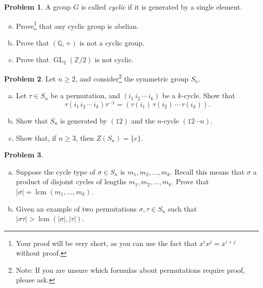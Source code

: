 \documentclass[11pt]{article}
\DeclareMathOperator{\lcm}{lcm}
\theoremstyle{definition}
\newtheorem{problem}{Problem}
\begin{document}
\begin{problem}
	A group $G$ is called {\it cyclic} if it is generated by a single element. 
	
	\begin{enumerate}[(a)]
		\item Prove\footnote{Your proof will be very short, as you can use the fact that $x^ix^j = x^{i+j}$ without proof.} that any cyclic group is abelian. 
	
		\item Prove that $(\mathbb Q, +)$ is not a cyclic group.
	\item Prove that $\operatorname{GL}_2(\mathbb Z/2)$ is not cyclic.
	\end{enumerate}
\end{problem}


\begin{problem} Let $n\geq 2$, and consider\footnote{Note: If you are unsure which formulas about permutations require proof, please ask.} the symmetric group $S_n$.
\begin{enumerate}[(a)]
\item Let $\tau\in S_n$ be a permutation, and $(i_1 \, i_2 \, \cdots \, i_k)$ be a $k$-cycle. Show that 
\[ \tau (i_1 \, i_2 \, \cdots \, i_k)  \tau^{-1} = (\tau(i_1) \, \tau(i_2) \, \cdots \, \tau(i_k)).\]
\item Show that $S_n$ is generated by $(12)$ and the $n$-cycle $(12 \cdots n)$.
\item Show that, if $n\geq 3$, then $Z(S_n) = \{e\}$.
\end{enumerate}
\end{problem}



\begin{problem}
	\begin{enumerate}[(a)]
\item Suppose the cycle type of $\sigma \in S_n$ is $m_1, m_2, \ldots, m_k$. Recall this means that $\sigma$ a product of disjoint cycles of lengths $m_1, m_2, \ldots, m_k$. Prove that $|\sigma| = \lcm(m_1, \ldots, m_k)$. 
\item Given an example of two permutations $\sigma, \tau \in S_n$ such that $|\sigma\tau| > \lcm(|\sigma|,|\tau|)$.
\end{enumerate}
\end{problem}
\end{document}
